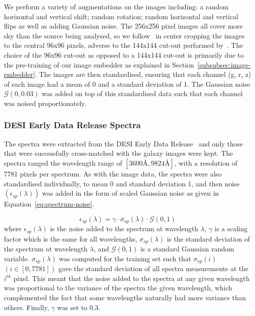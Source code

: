 We perform a variety of augmentations on the images including: a random horizontal and vertical shift; random rotation;
random horizontal and vertical flips as well as adding Gaussian noise.
The 256x256 pixel images all cover more sky than the source being analysed, so we follow~\cite{stein2022} in center
cropping the images to the central 96x96 pixels, adverse to the 144x144 cut-out performed by~\cite{astroclip}.
The choice of the 96x96 cut-out as opposed to a 144x144 cut-out is primarily due to the pre-training of our image embedder
as explained in Section~\eqref{subsubsec:image-embedder}.
The images are then standardised, ensuring that each channel (g, r, z) of each image had a mean
of 0 and a standard deviation of 1.
The Gaussian noise $\mathcal{G}(0, 0.03)$ was added on top of this standardised data such that each channel was noised
proportionately.


\subsubsection{DESI Early Data Release Spectra}\label{subsubsec:spectra}
The spectra were extracted from the DESI Early Data Release~\citep{desiearly2023} and only those that were successfully
cross-matched with the galaxy images were kept.
The spectra ranged the wavelength range of $[3600 \si{\angstrom}, 9824 \si{\angstrom}]$, with a resolution of 7781 pixels per spectrum.
As with the image data, the spectra were also standardised individually, to mean 0 and standard deviation 1, and then
noise $(\epsilon_{sp}(\lambda))$ was added in the form of scaled Gaussian noise as given in Equation~\eqref{eq:spectrum-noise}.

\begin{equation}
\label{eq:spectrum-noise}
    \epsilon_{sp}(\lambda) = \gamma \cdot \sigma_{sp}(\lambda) \cdot \mathcal{G}(0, 1)
\end{equation}
where $\epsilon_{sp}(\lambda)$ is the noise added to the spectrum at wavelength $\lambda$, $\gamma$ is a scaling factor
which is the same for all wavelengths, $\sigma_{sp}(\lambda)$ is the standard deviation of the spectrum at wavelength $\lambda$,
and $\mathcal{G}(0, 1)$ is a standard Gaussian random variable.
$\sigma_{sp}(\lambda)$ was computed for the training set such that $\sigma_{sp}(i)$ $(i \in [0, 7781])$ gave the standard
deviation of all spectra measurements at the $i^{th}$ pixel.
This meant that the noise added to the spectra at any given wavelength was proportional to the variance of the spectra
the given wavelength, which complemented the fact that some wavelengths naturally had more variance than others.
Finally, $\gamma$ was set to 0.3.

